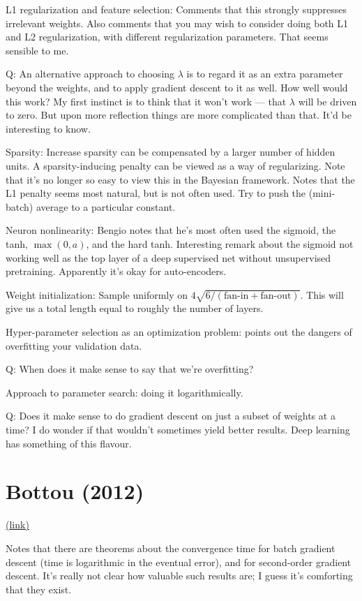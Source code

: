 \documentclass[12pt]{report}
\newcommand{\link}[2]{\href{#1}{#2}}
\begin{document}
L1 regularization and feature selection: Comments that this strongly
suppresses irrelevant weights.  Also comments that you may wish to
consider doing both L1 and L2 regularization, with different
regularization parameters.  That seems sensible to me.

Q: An alternative approach to choosing $\lambda$ is to regard it as an
extra parameter beyond the weights, and to apply gradient descent to
it as well.  How well would this work?  My first instinct is to think
that it won't work --- that $\lambda$ will be driven to zero.  But
upon more reflection things are more complicated than that.  It'd be
interesting to know.

Sparsity: Increase sparsity can be compensated by a larger number of
hidden units.  A sparsity-inducing penalty can be viewed as a way of
regularizing.  Note that it's no longer so easy to view this in the
Bayesian framework.  Notes that the L1 penalty seems most natural, but
is not often used.  Try to push the (mini-batch) average to a
particular constant.

Neuron nonlinearity: Bengio notes that he's most often used the
sigmoid, the tanh, $\max(0, a)$, and the hard tanh.  Interesting
remark about the sigmoid not working well as the top layer of a deep
supervised net without unsupervised pretraining.  Apparently it's okay
for auto-encoders.

Weight initialization: Sample uniformly on
$4\sqrt{6/(\mbox{fan-in}+\mbox{fan-out})}$.  This will give us a total
length equal to roughly the number of layers.

Hyper-parameter selection as an optimization problem: points out the
dangers of overfitting your validation data.

Q: When does it make sense to say that we're overfitting?

Approach to parameter search: doing it logarithmically.

Q: Does it make sense to do gradient descent on just a subset of
weights at a time? I do wonder if that wouldn't sometimes yield better
results.  Deep learning has something of this flavour.

\section{Bottou (2012)}

\link{http://leon.bottou.org/papers/bottou-tricks-2012}{(link)}

Notes that there are theorems about the convergence time for batch
gradient descent (time is logarithmic in the eventual error), and for
second-order gradient descent.  It's really not clear how valuable
such results are; I guess it's comforting that they exist.
\end{document}
